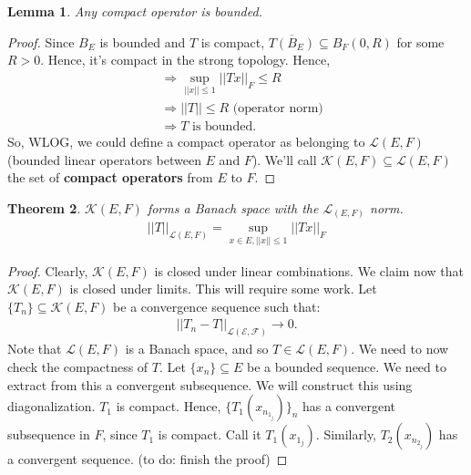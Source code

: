 \documentclass[psamsfonts]{amsart}
\newtheorem{thm}{Theorem}[section]
\newtheorem{lem}[thm]{Lemma}
\theoremstyle{definition}
\theoremstyle{remark}
\numberwithin{equation}{section}
\begin{document}
\begin{lem}
	Any compact operator is bounded.
\end{lem}
\begin{proof}
	Since \( B_E \) is bounded and \( T \) is compact, \( \overline{T(B_E)} \subseteq B_F(0, R) \) for some \( R > 0 \). Hence, it's compact in the strong topology. Hence, 
	\begin{align*}
		& \Rightarrow \sup_{||x || \leq 1}||Tx||_{F} \leq R \\
		& \Rightarrow ||T|| \leq R \text{ (operator norm)} \\
		& \Rightarrow T \text{ is bounded.}  
	\end{align*}
	So, WLOG, we could define a compact operator as belonging to \( \mathcal{L}(E, F) \) (bounded linear operators between \( E \) and \( F \)). We'll call \( \mathcal{K}(E, F) \subseteq \mathcal{L}(E,F) \) the set of \textbf{compact operators} from \( E \) to \( F \).
\end{proof}

\begin{thm}
	\( \mathcal{K}(E,F) \) forms a Banach space with the \( \mathcal{L}_{(E,F)} \) norm. 
	\begin{align*}
		|| T||_{\mathcal{L}(E,F)} = \sup_{x \in E, ||x|| \leq 1 } ||Tx||_F 
	\end{align*}
\end{thm}



\begin{proof}
	Clearly, \( \mathcal{K}(E, F) \) is closed under linear combinations. We claim now that \( \mathcal{K}(E, F) \) is closed under limits. This will require some work. Let \( \{ T_n \} \subseteq \mathcal{K}(E, F) \) be a convergence sequence such that:
	\begin{align*}
		||T_n - T ||_{\mathcal{L(E,F)} } \rightarrow 0.
	\end{align*}
	Note that \( \mathcal{L}(E,F) \) is a Banach space, and so \( T \in \mathcal{L}(E,F) \). We need to now check the compactness of \( T \). Let \( \{ x_n \} \subseteq E \) be a bounded sequence. We need to extract from this a convergent subsequence. We will construct this using diagonalization.
	\newline
	\newline
	\( T_1 \) is compact. Hence, \( \{ T_1(x_{n_{1_j}}) \}_n  \) has a convergent subsequence in \( F \), since \( T_1 \) is compact. Call it \( T_1(x_{1_j} ) \). Similarly, \( T_2(x_{n_{2_j}}) \) has a convergent sequence. (to do: finish the proof)
\end{proof}
\end{document}
